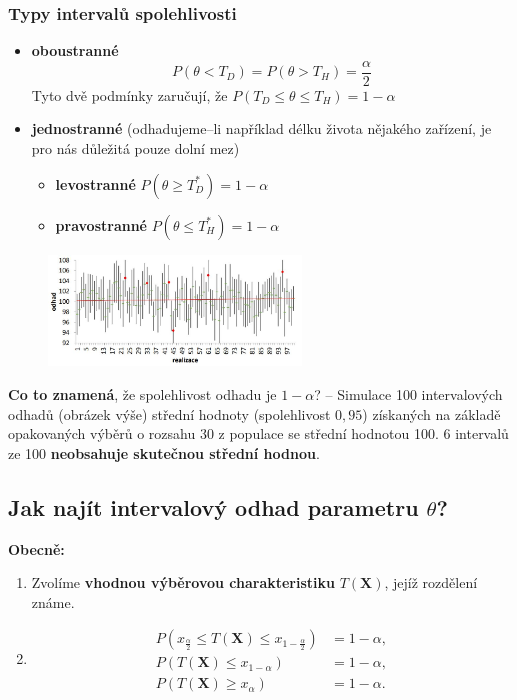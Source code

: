 \subsubsection*{Typy intervalů spolehlivosti}
	\begin{itemize}
		\item \textbf{oboustranné} 
		\begin{equation*}
				P(\theta < T_D) = P(\theta > T_H) = \frac{\alpha}{2}
		\end{equation*}
		Tyto dvě podmínky zaručují, že $P(T_D \leq \theta \leq T_H) = 1 - \alpha$
		\item \textbf{jednostranné} (odhadujeme--li například délku života nějakého zařízení, je pro nás důležitá pouze dolní mez)
		\begin{itemize}
			\item \textbf{levostranné} $P(\theta \geq T_D^*) = 1 - \alpha$
			\item \textbf{pravostranné} $P(\theta \leq T_H^*) = 1 - \alpha$
		\end{itemize}
	\end{itemize}
\begin{figure}[H]
\centering
\includegraphics[width=0.6\textwidth]{assets/14_spolehlivost_odhadu}
\end{figure}
\textbf{Co to znamená}, že spolehlivost odhadu je $1- \alpha$? -- Simulace 100 intervalových odhadů  (obrázek výše) střední hodnoty (spolehlivost $0,95$) získaných na základě opakovaných výběrů o rozsahu 30 z populace se střední hodnotou 100. 6 intervalů ze 100 \textbf{neobsahuje skutečnou střední hodnou}.
\subsection{Jak najít intervalový odhad parametru $\theta$?}
\textbf{Obecně:}
\begin{enumerate}
	\item Zvolíme \textbf{vhodnou výběrovou charakteristiku} $T(\mathbf{X})$, jejíž rozdělení známe.
	\item \begin{equation*}
			\begin{split}
				P(x_\frac{\alpha}{2} \leq T(\mathbf{X}) \leq x_{1 - \frac{\alpha}{2}}) &= 1 - \alpha, \\
				P(T(\mathbf{X}) \leq x_{1-\alpha}) &= 1 - \alpha, \\
				P(T(\mathbf{X}) \geq x_\alpha) &= 1 - \alpha.	
			\end{split}
		\end{equation*}
\end{enumerate}

